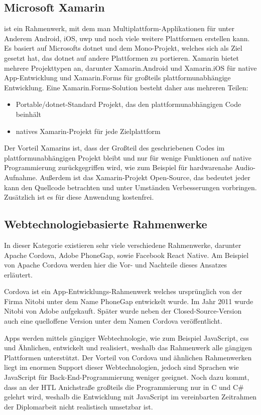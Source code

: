 \subsection{Microsoft Xamarin}
ist ein Rahmenwerk, mit dem man Multiplattform-Applikationen für unter Anderem Android, iOS, \ac{uwp} und noch viele weitere Plattformen erstellen kann.
Es basiert auf Microsofts \ac{dotnet} und dem Mono-Projekt, welches sich als Ziel gesetzt hat, das \ac{dotnet} auf andere Plattformen zu portieren.
Xamarin bietet mehrere Projekttypen an, darunter Xamarin.Android und Xamarin.iOS für native App-Entwicklung und Xamarin.Forms für großteils plattformunabhängige Entwicklung.
Eine Xamarin.Forms-Solution besteht daher aus mehreren Teilen:
\begin{itemize}
    \item Portable/\acs{dotnet}-Standard Projekt, das den plattformunabhängigen Code beinhält
    \item natives Xamarin-Projekt für jede Zielplattform
\end{itemize}
Der Vorteil Xamarins ist, dass der Großteil des geschriebenen Codes im plattformunabhängigen Projekt bleibt und nur für wenige Funktionen auf native Programmierung zurückgegriffen wird, wie zum Beispiel für hardwarenahe Audio-Aufnahme.
Außerdem ist das Xamarin-Projekt Open-Source, das bedeutet jeder kann den Quellcode betrachten und unter Umständen Verbesserungen vorbringen.
Zusätzlich ist es für diese Anwendung kostenfrei.

\subsection{Webtechnologiebasierte Rahmenwerke}
In dieser Kategorie existieren sehr viele verschiedene Rahmenwerke, darunter Apache Cordova, Adobe PhoneGap, sowie Facebook React Native.
Am Beispiel von Apache Cordova werden hier die Vor- und Nachteile dieses Ansatzes erläutert.

Cordova ist ein App-Entwicklungs-Rahmenwerk welches ursprünglich von der Firma Nitobi unter dem Name PhoneGap entwickelt wurde.
Im Jahr 2011 wurde Nitobi von Adobe aufgekauft.
Später wurde neben der Closed-Source-Version auch eine quelloffene Version unter dem Namen Cordova veröffentlicht. \cite{adobe-phonegap}\par

Apps werden mittels gängiger Webtechnologie, wie zum Beispiel JavaScript, \acs{css} und Ähnlichen, entwickelt und realisiert, weshalb das Rahmenwerk alle gängigen Plattformen unterstützt.
Der Vorteil von Cordova und ähnlichen Rahmenwerken liegt im enormen Support dieser Webtechnologien, jedoch sind Sprachen wie JavaScript für Back-End-Programmierung weniger geeignet.
Noch dazu kommt, dass an der HTL Anichstraße großteils die Programmierung nur in C und C\# gelehrt wird, weshalb die Entwicklung mit JavaScript im vereinbarten Zeitrahmen der Diplomarbeit nicht realistisch umsetzbar ist.


